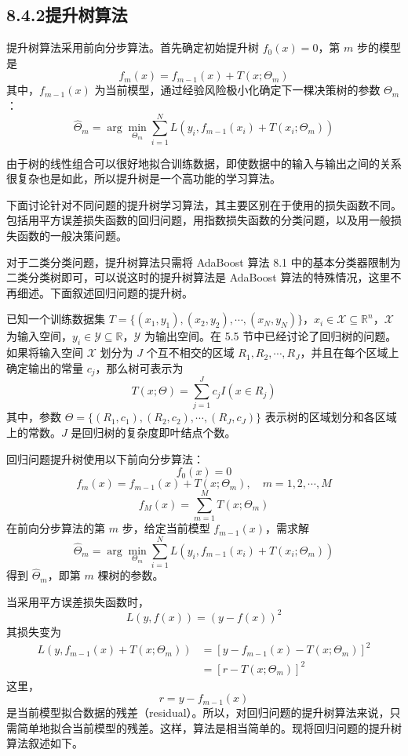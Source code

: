 \documentclass[UTF8, 12pt, fontset=fandol, oneside]{ctexart}
\begin{document}
\subsection*{8.4.2\quad 提升树算法}

提升树算法采用前向分步算法。首先确定初始提升树 $f_0(x)=0$，第 $m$ 步的模型是
\begin{equation}
f_m(x)=f_{m-1}(x)+T(x;\Theta_m)
\tag{8.25}
\end{equation}
其中，$f_{m-1}(x)$ 为当前模型，通过经验风险极小化确定下一棵决策树的参数 $\Theta_m$：
\begin{equation}
\hat{\Theta}_m=\arg\min_{\Theta_m}\sum_{i=1}^N
L(y_i,f_{m-1}(x_i)+T(x_i;\Theta_m))
\tag{8.26}
\end{equation}

由于树的线性组合可以很好地拟合训练数据，即使数据中的输入与输出之间的关系很复杂也是如此，所以提升树是一个高功能的学习算法。

下面讨论针对不同问题的提升树学习算法，其主要区别在于使用的损失函数不同。包括用平方误差损失函数的回归问题，用指数损失函数的分类问题，以及用一般损失函数的一般决策问题。

对于二类分类问题，提升树算法只需将 AdaBoost 算法 8.1 中的基本分类器限制为二类分类树即可，可以说这时的提升树算法是 AdaBoost 算法的特殊情况，这里不再细述。下面叙述回归问题的提升树。

已知一个训练数据集 $T=\{(x_1,y_1),(x_2,y_2),\cdots,(x_N,y_N)\}$，$x_i\in\mathcal{X}\subseteq\mathbb{R}^n$，$\mathcal{X}$ 为输入空间，$y_i\in\mathcal{Y}\subseteq\mathbb{R}$，$\mathcal{Y}$ 为输出空间。在 5.5 节中已经讨论了回归树的问题。如果将输入空间 $\mathcal{X}$ 划分为 $J$ 个互不相交的区域 $R_1,R_2,\cdots,R_J$，并且在每个区域上确定输出的常量 $c_j$，那么树可表示为
\begin{equation}
T(x;\Theta)=\sum_{j=1}^J c_jI(x\in R_j)
\tag{8.27}
\end{equation}
其中，参数 $\Theta=\{(R_1,c_1),(R_2,c_2),\cdots,(R_J,c_J)\}$ 表示树的区域划分和各区域上的常数。$J$ 是回归树的复杂度即叶结点个数。

回归问题提升树使用以下前向分步算法：
\[
f_0(x)=0
\]
\[
f_m(x)=f_{m-1}(x)+T(x;\Theta_m),\quad m=1,2,\cdots,M
\]
\[
f_M(x)=\sum_{m=1}^M T(x;\Theta_m)
\]
在前向分步算法的第 $m$ 步，给定当前模型 $f_{m-1}(x)$，需求解
\[
\hat{\Theta}_m=\arg\min_{\Theta_m}\sum_{i=1}^N
L(y_i,f_{m-1}(x_i)+T(x_i;\Theta_m))
\]
得到 $\hat{\Theta}_m$，即第 $m$ 棵树的参数。

当采用平方误差损失函数时，
\[
L(y,f(x))=(y-f(x))^2
\]
其损失变为
\[
\begin{aligned}
L(y,f_{m-1}(x)+T(x;\Theta_m))
&=[y-f_{m-1}(x)-T(x;\Theta_m)]^2\\
&=[r-T(x;\Theta_m)]^2
\end{aligned}
\]
这里，
\begin{equation}
r=y-f_{m-1}(x)
\tag{8.28}
\end{equation}
是当前模型拟合数据的残差（residual）。所以，对回归问题的提升树算法来说，只需简单地拟合当前模型的残差。这样，算法是相当简单的。现将回归问题的提升树算法叙述如下。
\end{document}
